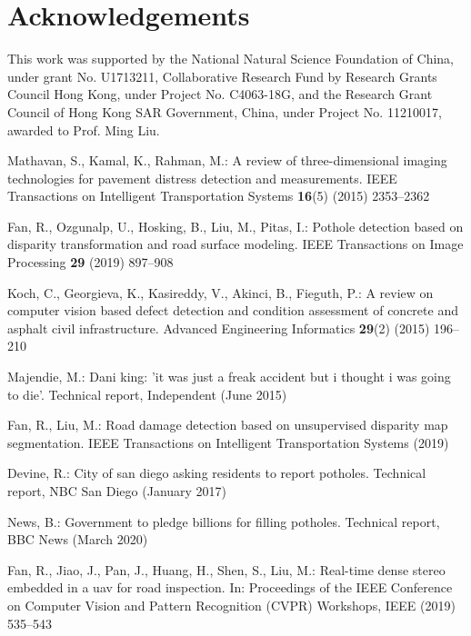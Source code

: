 \documentclass[runningheads]{llncs}
\begin{document}
\section*{Acknowledgements}
This work was supported by the National Natural Science Foundation of China, under grant No. U1713211, Collaborative Research Fund by Research Grants Council Hong Kong, under Project No. C4063-18G, and the Research Grant Council of Hong Kong SAR Government, China, under Project No. 11210017, awarded to Prof. Ming Liu.

\clearpage

\begin{thebibliography}{10}
	
	Mathavan, S., Kamal, K., Rahman, M.:
	\newblock A review of three-dimensional imaging technologies for pavement
	distress detection and measurements.
	\newblock IEEE Transactions on Intelligent Transportation Systems
	\textbf{16}(5) (2015)  2353--2362
	
	Fan, R., Ozgunalp, U., Hosking, B., Liu, M., Pitas, I.:
	\newblock Pothole detection based on disparity transformation and road surface
	modeling.
	\newblock IEEE Transactions on Image Processing \textbf{29} (2019)  897--908
	
	Koch, C., Georgieva, K., Kasireddy, V., Akinci, B., Fieguth, P.:
	\newblock A review on computer vision based defect detection and condition
	assessment of concrete and asphalt civil infrastructure.
	\newblock Advanced Engineering Informatics \textbf{29}(2) (2015)  196--210
	
	Majendie, M.:
	\newblock Dani king: 'it was just a freak accident but i thought i was going to
	die'.
	\newblock Technical report, Independent (June 2015)
	
	Fan, R., Liu, M.:
	\newblock Road damage detection based on unsupervised disparity map
	segmentation.
	\newblock IEEE Transactions on Intelligent Transportation Systems (2019)
	
	Devine, R.:
	\newblock City of san diego asking residents to report potholes.
	\newblock Technical report, NBC San Diego (January 2017)
	
	News, B.:
	\newblock Government to pledge billions for filling potholes.
	\newblock Technical report, BBC News (March 2020)
	
	Fan, R., Jiao, J., Pan, J., Huang, H., Shen, S., Liu, M.:
	\newblock Real-time dense stereo embedded in a uav for road inspection.
	\newblock In: Proceedings of the IEEE Conference on Computer Vision and Pattern
	Recognition (CVPR) Workshops, IEEE (2019)  535--543
	

\end{thebibliography}
\end{document}
